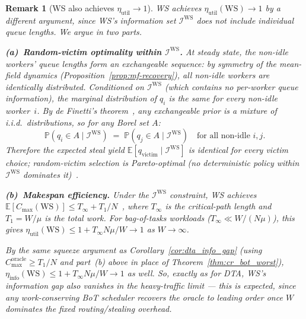 \documentclass[11pt,a4paper]{report}
\newtheorem{remark}{Remark}[section]
\begin{document}
\begin{remark}[WS also achieves $\eta_{\mathrm{util}}\to 1$]
\label{rem:ws_opt}
WS achieves $\eta_{\mathrm{util}}(\mathrm{WS})\to 1$ by a
\emph{different} argument, since WS's information set
$\mathcal{I}^{\mathrm{WS}}$ does not include individual queue lengths.
We argue in two parts.

\noindent\textbf{(a)~Random-victim optimality within $\mathcal{I}^{\mathrm{WS}}$.}
At steady state, the non-idle workers' queue lengths form an
\emph{exchangeable} sequence: by symmetry of the mean-field dynamics
(Proposition~\ref{prop:mf-recovery}), all non-idle workers are
identically distributed.  Conditioned on $\mathcal{I}^{\mathrm{WS}}$
(which contains no per-worker queue information), the marginal
distribution of $q_i$ is the same for every non-idle worker~$i$.
By de Finetti's theorem~\cite{norris1997}, any exchangeable prior
is a mixture of i.i.d.\ distributions, so for any Borel set $A$:
\[
  \mathbb{P}(q_i \in A \mid \mathcal{I}^{\mathrm{WS}})
  \;=\;
  \mathbb{P}(q_j \in A \mid \mathcal{I}^{\mathrm{WS}})
  \quad\text{for all non-idle }i,j.
\]
Therefore the expected steal yield $\mathbb{E}[q_{\mathrm{victim}} \mid
\mathcal{I}^{\mathrm{WS}}]$ is \emph{identical} for every victim choice;
random-victim selection is Pareto-optimal (no deterministic policy
within $\mathcal{I}^{\mathrm{WS}}$ dominates it)~\cite{blumofe1999}.

\noindent\textbf{(b)~Makespan efficiency.}
Under the $\mathcal{I}^{\mathrm{WS}}$ constraint, WS achieves
$\mathbb{E}[C_{\max}(\mathrm{WS})] \leq T_\infty + T_1/N$~\cite{blumofe1999},
where $T_\infty$ is the critical-path length and $T_1 = W/\mu$ is the
total work.  For bag-of-tasks workloads ($T_\infty \ll W/(N\mu)$),
this gives $\eta_{\mathrm{util}}(\mathrm{WS}) \leq 1 + T_\infty N\mu/W
\to 1$ as $W \to \infty$.

By the same squeeze argument as Corollary~\ref{cor:dta_info_gap}
(using $C_{\max}^{\mathrm{oracle}} \geq T_1/N$ and part~(b) above in place
of Theorem~\ref{thm:cr_bot_worst}), $\eta_{\mathrm{info}}(\mathrm{WS})
\leq 1 + T_\infty N\mu/W \to 1$ as well. So, exactly as for DTA, WS's
information gap also vanishes in the heavy-traffic limit --- this is
expected, since \emph{any} work-conserving BoT scheduler recovers the
oracle to leading order once $W$ dominates the fixed routing/stealing
overhead.


\end{remark}
\end{document}
